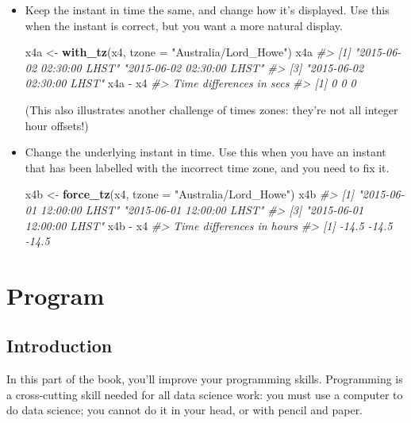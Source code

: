 \documentclass[]{book}
\newenvironment{Shaded}{\begin{snugshade}}{\end{snugshade}}
\newcommand{\KeywordTok}[1]{\textcolor[rgb]{0.13,0.29,0.53}{\textbf{{#1}}}}
\newcommand{\DataTypeTok}[1]{\textcolor[rgb]{0.13,0.29,0.53}{{#1}}}
\newcommand{\StringTok}[1]{\textcolor[rgb]{0.31,0.60,0.02}{{#1}}}
\newcommand{\CommentTok}[1]{\textcolor[rgb]{0.56,0.35,0.01}{\textit{{#1}}}}
\newcommand{\NormalTok}[1]{{#1}}
\begin{document}
\begin{itemize}
\item
  Keep the instant in time the same, and change how it's displayed. Use
  this when the instant is correct, but you want a more natural display.

\begin{Shaded}
\begin{Highlighting}[]
\NormalTok{x4a <-}\StringTok{ }\KeywordTok{with_tz}\NormalTok{(x4, }\DataTypeTok{tzone =} \StringTok{"Australia/Lord_Howe"}\NormalTok{)}
\NormalTok{x4a}
\CommentTok{#> [1] "2015-06-02 02:30:00 LHST" "2015-06-02 02:30:00 LHST"}
\CommentTok{#> [3] "2015-06-02 02:30:00 LHST"}
\NormalTok{x4a -}\StringTok{ }\NormalTok{x4}
\CommentTok{#> Time differences in secs}
\CommentTok{#> [1] 0 0 0}
\end{Highlighting}
\end{Shaded}

  (This also illustrates another challenge of times zones: they're not
  all integer hour offsets!)
\item
  Change the underlying instant in time. Use this when you have an
  instant that has been labelled with the incorrect time zone, and you
  need to fix it.

\begin{Shaded}
\begin{Highlighting}[]
\NormalTok{x4b <-}\StringTok{ }\KeywordTok{force_tz}\NormalTok{(x4, }\DataTypeTok{tzone =} \StringTok{"Australia/Lord_Howe"}\NormalTok{)}
\NormalTok{x4b}
\CommentTok{#> [1] "2015-06-01 12:00:00 LHST" "2015-06-01 12:00:00 LHST"}
\CommentTok{#> [3] "2015-06-01 12:00:00 LHST"}
\NormalTok{x4b -}\StringTok{ }\NormalTok{x4}
\CommentTok{#> Time differences in hours}
\CommentTok{#> [1] -14.5 -14.5 -14.5}
\end{Highlighting}
\end{Shaded}
\end{itemize}

\part{Program}\label{part-program}


\chapter{Introduction}\label{program-intro}

In this part of the book, you'll improve your programming skills.
Programming is a cross-cutting skill needed for all data science work:
you must use a computer to do data science; you cannot do it in your
head, or with pencil and paper.
\end{document}
